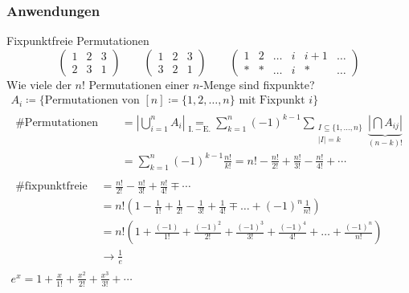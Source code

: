 \subsubsection{Anwendungen}
Fixpunktfreie Permutationen\\
\[
\begin{pmatrix}
	1	& 2	& 3	\\
	2	& 3	& 1
\end{pmatrix} \qquad \begin{pmatrix}
	1	& 2	& 3	\\
	3	& 2	& 1
\end{pmatrix} \qquad
\begin{pmatrix}
	1	& 2	& \dots	& i	& i+1	& \dots	\\
	*	& *	& \dots	& i	& *	& \dots	
\end{pmatrix}
\]
Wie viele der $n!$ Permutationen einer $n$-Menge sind fixpunkte? \\
\begin{gather*}
	A_i \coloneqq \{ \text{Permutationen von } [n] \coloneqq \{1, 2, \dots, n \} \text{ mit Fixpunkt } i \} \\
	\begin{split}
	\text{\# Permutationen mit Fixpunkt} &= |\bigcup_{i=1}^n A_i| \underset{\mathrm{I.-E.}}{=} \sum_{k=1}^n (-1)^{k-1} \sum_{\substack{I \subseteq \{1, \dotsc , n\}\\|I| = k}} \underbrace{|\bigcap A_{ij}|}_{(n-k)!} \\
	&= \sum_{k=1}^n (-1)^{k-1} \frac{n!}{k!} = n! - \frac{n!}{2!} + \frac{n!}{3!} - \frac{n!}{4!} + \dotsb
	\end{split} \\
	\begin{split}
	\text{\# fixpunktfreie } &= \frac{n!}{2!} -\frac{n!}{3!} +\frac{n!}{4!} \mp \dotsb \\
	&= n! ( 1 - \frac{1}{1!} +\frac{1}{2!} - \frac{1}{3!} + \frac{1}{4!} \mp \dots + (-1)^n \frac{1}{n!} ) \\
	&= n! ( 1 + \frac{(-1)}{1!} +\frac{(-1)^2}{2!} + \frac{(-1)^3}{3!} + \frac{(-1)^4}{4!} + \dots + \frac{(-1)^n}{n!} ) \\
	&\rightarrow \frac{1}{e}
	\end{split} \\
	e^x = 1 + \frac{x}{1!} +\frac{x^2}{2!} +\frac{x^3}{3!} + \dotsb
\end{gather*}

